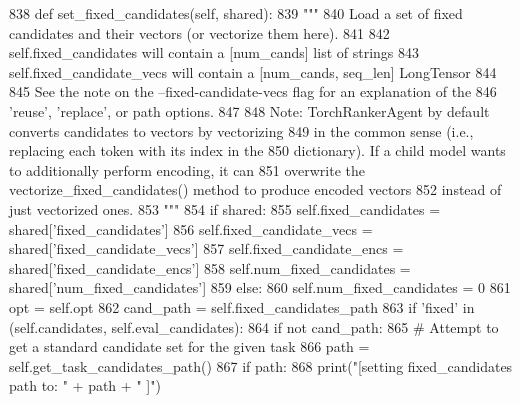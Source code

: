 \begin{DoxyCode}
838     \textcolor{keyword}{def }set\_fixed\_candidates(self, shared):
839         \textcolor{stringliteral}{"""}
840 \textcolor{stringliteral}{        Load a set of fixed candidates and their vectors (or vectorize them here).}
841 \textcolor{stringliteral}{}
842 \textcolor{stringliteral}{        self.fixed\_candidates will contain a [num\_cands] list of strings}
843 \textcolor{stringliteral}{        self.fixed\_candidate\_vecs will contain a [num\_cands, seq\_len] LongTensor}
844 \textcolor{stringliteral}{}
845 \textcolor{stringliteral}{        See the note on the --fixed-candidate-vecs flag for an explanation of the}
846 \textcolor{stringliteral}{        'reuse', 'replace', or path options.}
847 \textcolor{stringliteral}{}
848 \textcolor{stringliteral}{        Note: TorchRankerAgent by default converts candidates to vectors by vectorizing}
849 \textcolor{stringliteral}{        in the common sense (i.e., replacing each token with its index in the}
850 \textcolor{stringliteral}{        dictionary). If a child model wants to additionally perform encoding, it can}
851 \textcolor{stringliteral}{        overwrite the vectorize\_fixed\_candidates() method to produce encoded vectors}
852 \textcolor{stringliteral}{        instead of just vectorized ones.}
853 \textcolor{stringliteral}{        """}
854         \textcolor{keywordflow}{if} shared:
855             self.fixed\_candidates = shared[\textcolor{stringliteral}{'fixed\_candidates'}]
856             self.fixed\_candidate\_vecs = shared[\textcolor{stringliteral}{'fixed\_candidate\_vecs'}]
857             self.fixed\_candidate\_encs = shared[\textcolor{stringliteral}{'fixed\_candidate\_encs'}]
858             self.num\_fixed\_candidates = shared[\textcolor{stringliteral}{'num\_fixed\_candidates'}]
859         \textcolor{keywordflow}{else}:
860             self.num\_fixed\_candidates = 0
861             opt = self.opt
862             cand\_path = self.fixed\_candidates\_path
863             \textcolor{keywordflow}{if} \textcolor{stringliteral}{'fixed'} \textcolor{keywordflow}{in} (self.candidates, self.eval\_candidates):
864                 \textcolor{keywordflow}{if} \textcolor{keywordflow}{not} cand\_path:
865                     \textcolor{comment}{# Attempt to get a standard candidate set for the given task}
866                     path = self.get\_task\_candidates\_path()
867                     \textcolor{keywordflow}{if} path:
868                         print(\textcolor{stringliteral}{"[setting fixed\_candidates path to: "} + path + \textcolor{stringliteral}{" ]"})

\end{DoxyCode}
